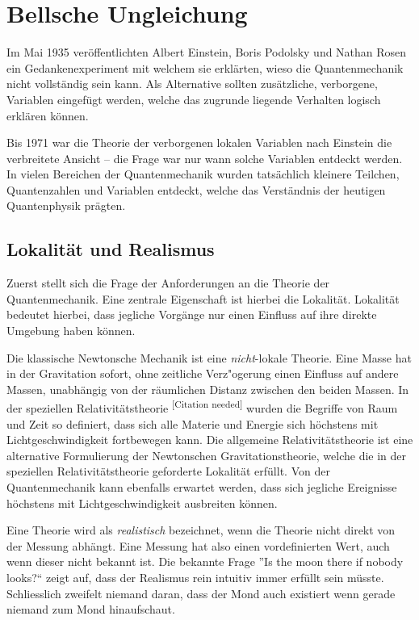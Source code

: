 \chapter{Bellsche Ungleichung\label{chapter:bell}}
\begin{refsection}

Im Mai 1935 ver\"offentlichten Albert Einstein, Boris Podolsky und
Nathan Rosen ein Gedankenexperiment mit welchem sie erkl\"arten, wieso
die Quantenmechanik nicht vollst\"andig sein kann. Als Alternative
sollten zus\"atzliche, verborgene, Variablen eingef\"ugt werden, welche
das zugrunde liegende Verhalten logisch erkl\"aren k\"onnen.

Bis 1971 war die Theorie der verborgenen lokalen Variablen nach Einstein
die verbreitete Ansicht -- die Frage war nur wann solche Variablen
entdeckt werden. In vielen Bereichen der Quantenmechanik wurden tatsächlich
kleinere Teilchen, Quantenzahlen und Variablen entdeckt, welche das
Verständnis der heutigen Quantenphysik prägten.

\section{Lokalit\"at und Realismus\label{section:bell:lokalitaet}}
Zuerst stellt sich die Frage der Anforderungen an die Theorie der
Quantenmechanik. Eine zentrale Eigenschaft ist hierbei die Lokalit\"at.
Lokalit\"at bedeutet hierbei, dass jegliche Vorg\"ange nur einen Einfluss
auf ihre direkte Umgebung haben k\"onnen.

Die klassische Newtonsche Mechanik ist eine \emph{nicht}-lokale 
Theorie. Eine Masse hat in der Gravitation sofort, ohne zeitliche 
Verz"ogerung einen Einfluss auf andere Massen, unabh\"angig von der
r\"aumlichen Distanz zwischen den beiden Massen. 
In der speziellen Relativit\"atstheorie 
\textsuperscript{[Citation needed]}
wurden die Begriffe von Raum und Zeit so definiert, dass sich alle
Materie und Energie sich h\"ochstens mit Lichtgeschwindigkeit fortbewegen
kann. 
Die allgemeine Relativit\"atstheorie ist eine alternative Formulierung
der Newtonschen Gravitationstheorie, welche die in der speziellen
Relativit\"atstheorie geforderte Lokalit\"at erf\"ullt.
Von der Quantenmechanik kann ebenfalls erwartet werden, dass sich
jegliche Ereignisse h\"ochstens mit Lichtgeschwindigkeit ausbreiten
k\"onnen.

Eine Theorie wird als \emph{realistisch} bezeichnet, wenn die Theorie
nicht direkt von der Messung abh\"angt. Eine Messung hat also einen
vordefinierten Wert, auch wenn dieser nicht bekannt ist.
Die bekannte Frage ''Is the moon there if nobody looks?{``} zeigt auf,
dass der Realismus rein intuitiv immer erf\"ullt sein m\"usste. Schliesslich
zweifelt niemand daran, dass der Mond auch existiert wenn gerade niemand
zum Mond hinaufschaut.


\end{refsection}
